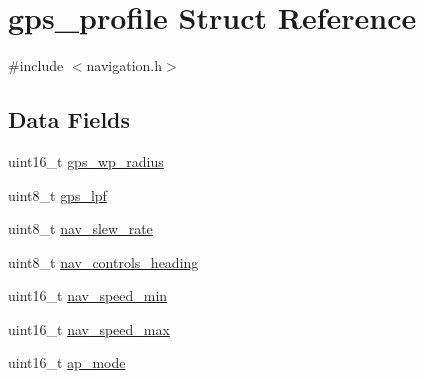\hypertarget{structgps__profile}{\section{gps\+\_\+profile Struct Reference}
\label{structgps__profile}
}


{\ttfamily \#include $<$navigation.\+h$>$}

\subsection*{Data Fields}
\begin{DoxyCompactItemize}
\item 
uint16\+\_\+t \hyperlink{structgps__profile_abe5ed888a6001845c0a62ab73526d2b8}{gps\+\_\+wp\+\_\+radius}
\item 
uint8\+\_\+t \hyperlink{structgps__profile_a805c7b7e12d1314f2a881ce70057ac4b}{gps\+\_\+lpf}
\item 
uint8\+\_\+t \hyperlink{structgps__profile_ac5b538b36f8fe64e27c5006d8c29a9a7}{nav\+\_\+slew\+\_\+rate}
\item 
uint8\+\_\+t \hyperlink{structgps__profile_a42f6a83d6ca890d29ffdd3ce76d5a268}{nav\+\_\+controls\+\_\+heading}
\item 
uint16\+\_\+t \hyperlink{structgps__profile_a3c9ed4d00381c2107ca1691c9b28ed91}{nav\+\_\+speed\+\_\+min}
\item 
uint16\+\_\+t \hyperlink{structgps__profile_aee5403d5fc109f7e2e382a5448c7c378}{nav\+\_\+speed\+\_\+max}
\item 
uint16\+\_\+t \hyperlink{structgps__profile_a29fc311ff10040d40a79d1a2fd710cc1}{ap\+\_\+mode}
\end{DoxyCompactItemize}



